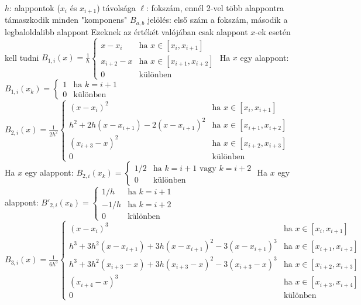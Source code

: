 \documentclass[12pt,a4paper]{article}
\begin{document}
\begin{outline}
	\1 $h$: alappontok ($x_i$ és $x_{i+1}$) távolsága
	\1 $\ell$: fokszám, ennél 2-vel több alappontra támaszkodik minden "komponens"
	\1 $B_{a,b}$ jelölés: első szám a fokszám, második a legbaloldalibb alappont
		\2 Ezeknek az értékét valójában csak alappont $x$-ek esetén kell tudni
	\1 $B_{1,i}(x) = \frac{1}{h} \begin{cases}
		x-x_i & \text{ha } x \in [x_i,x_{i+1}] \\
		x_{i+2}-x & \text{ha } x \in [x_{i+1},x_{i+2}] \\
		0 & \text{különben}
	\end{cases}$
		\2 Ha $x$ egy alappont: $B_{1,i}(x_k) = \begin{cases}
			1 & \text{ha } k = i + 1 \\
			0 & \text{különben}
		\end{cases}$
	\1 $B_{2,i}(x) = \frac{1}{2h^2} \begin{cases}
		(x-x_i)^2 & \text{ha } x \in [x_i,x_{i+1}] \\
		h^2 + 2h(x-x_{i+1}) - 2(x-x_{i+1})^2 & \text{ha } x \in [x_{i+1},x_{i+2}] \\
		(x_{i+3}-x)^2 & \text{ha } x \in [x_{i+2},x_{i+3}] \\
		0 & \text{különben}
	\end{cases}$
		\2 Ha $x$ egy alappont: $B_{2,i}(x_k) = \begin{cases}
			1/2 & \text{ha } k = i + 1 \text{ vagy } k = i + 2 \\
			0 & \text{különben}
		\end{cases}$
		\2 Ha $x$ egy alappont: $B'_{2,i}(x_k) = \begin{cases}
			1/h & \text{ha } k = i + 1 \\
			-1/h & \text{ha } k = i + 2 \\
			0 & \text{különben}
		\end{cases}$
\pagebreak
	\1 $B_{3,i}(x) = \frac{1}{6h^3} \begin{cases}
		(x-x_i)^3 & \text{ha } x \in [x_i,x_{i+1}] \\
		h^3 + 3h^2(x-x_{i+1}) + 3h(x-x_{i+1})^2 - 3(x-x_{i+1})^3 & \text{ha } x \in [x_{i+1},x_{i+2}] \\
		h^3 + 3h^2(x_{i+3}-x) + 3h(x_{i+3}-x)^2 - 3(x_{i+3}-x)^3 & \text{ha } x \in [x_{i+2},x_{i+3}] \\
		(x_{i+4}-x)^3 & \text{ha } x \in [x_{i+3},x_{i+4}] \\
		0 & \text{különben}
	\end{cases}$

\end{outline}
\end{document}
